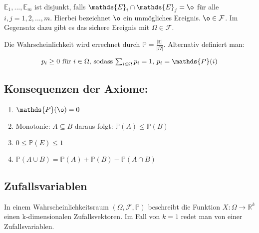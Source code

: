 \documentclass{article}
\begin{document}
$\mathds{E}_{1},...,\mathds{E}_{m}$ ist disjunkt, falls $\mathds{E}_{i} \cap \mathds{E}_{j} = \o$ f\"ur alle $i,j= 1,2,...,m$. 
Hierbei bezeichnet $\o$ ein unm\"ogliches Ereignis. $\o \in \mathcal{F}$. Im Gegensatz dazu gibt es das sichere Ereignis mit ${\Omega} \in \mathcal{F}$.

\vspace{5pt}

Die Wahrscheinlichkeit wird errechnet durch $ \mathds{P} = \frac {|\mathds{E}|}{|\Omega|}$.
Alternativ definiert man: 

\vspace{5pt}

\begin{equation*}
p_{i} \geq 0 $ f\"ur $i \in \Omega$, sodass $\sum_{i\in \Omega} p_{i} =1$, $p_{i} = \mathds{P} ({i})
\end{equation*}


\vspace{10pt}

\subsection *{Konsequenzen der Axiome:}

\vspace{5pt}

\begin{enumerate}
	\item $\mathds{P} (\o) = 0$
	\item Monotonie: $A\subseteq B$ daraus folgt: $\mathds{P} (A) \leq \mathds{P} (B)$
	\item $0 \leq \mathds{P} (E) \leq 1$
	\item $ \mathds{P} (A \cup B) = \mathds{P} (A) + \mathds{P} (B) - \mathds{P} (A \cap B)$
\end{enumerate}


\vspace{10pt}

\subsection *{Zufallsvariablen}

\vspace{5pt}

In einem Wahrscheinlichkeitsraum $(\Omega, \mathcal{F}, \mathds{P})$ beschreibt die Funktion $X:\Omega \longrightarrow \mathds{R}^k$ einen k-dimensionalen Zufallsvektoren. Im Fall von $k=1$ redet man von einer Zufallsvariablen.
\end{document}

